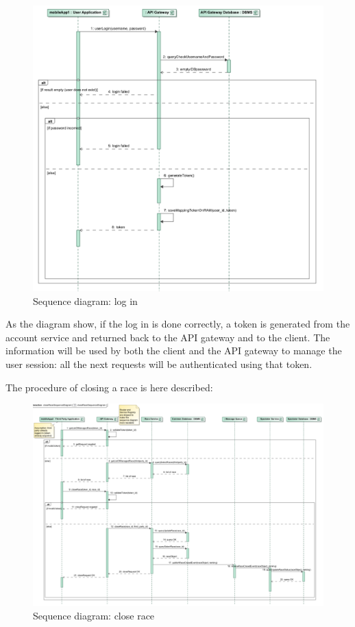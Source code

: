 \begin{figure}[H]
\includegraphics[width=\linewidth]{Images/login.pdf}
\caption{ Sequence diagram: log in}
\label{fig:login}
\end{figure}

As the diagram show, if the log in is done correctly, a token is generated from the account service and returned back to the API gateway
and to the client. 
The information will be used by both the client and the API gateway to manage the user session: all the next requests will be authenticated
using that token.  \\

\par 
The procedure of closing a race is here described: 

\begin{figure}[H]
\includegraphics[width=\linewidth]{Images/closerace.pdf}
\caption{ Sequence diagram: close race}
\label{fig:closerace}
\end{figure}


